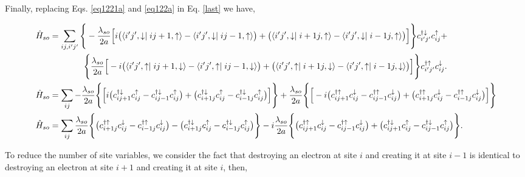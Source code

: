 \documentclass[10pt,prb,showpacs,amssymb,floatfix]{revtex4-1}
\begin{document}
Finally, replacing Eqs. \eqref{eq1221a} and \eqref{eq122a} in Eq. \eqref{last} we have,

\begin{align}
\label{last20}
\hat H_{so} &= \sum_{ij,i'j'} \Bigg{\{}  -\frac{\lambda_{so}}{2a} \Big{[} i \big{(} \langle i'j',\downarrow \mid  ij+1,\uparrow \rangle - \langle i'j',\downarrow \mid ij-1,\uparrow \rangle \big{)} + \big{(} \langle i'j',\downarrow \mid i+1j,\uparrow \rangle -  \langle i'j',\downarrow \mid i-1j,\uparrow \rangle\big{)} \Big{]}  \Bigg{\}} c_{i'j'}^{\dagger \downarrow} c_{ij}^\uparrow + \\ &  ~~~~~~~~~~~~\Bigg{\{}\frac{\lambda_{so}}{2a} \Big{[} -i \big{(} \langle i'j',\uparrow \mid ij+1,\downarrow \rangle -  \langle i'j',\uparrow \mid ij-1,\downarrow \rangle  \big{)}+ \big{(} \langle i'j',\uparrow \mid i+1j,\downarrow \rangle - \langle i'j',\uparrow \mid i-1j,\downarrow \rangle \big{)} \Big{]} \Bigg{\}} c_{i'j'}^{\dagger \uparrow} c_{ij}^\downarrow. \\
\hat H_{so} &= \sum_{ij} -\frac{\lambda_{so}}{2a}\Bigg{\{} \Big{[}i \big{(} c_{ij+1}^{\dagger \downarrow} c_{ij}^\uparrow  - c_{ij-1}^{\dagger \downarrow} c_{ij}^\uparrow \big{)} + \big{(} c_{i+1j}^{\dagger \downarrow} c_{ij}^\uparrow - c_{i-1j}^{\dagger \downarrow} c_{ij}^\uparrow \big{)}  \Big{]} \Bigg{\}} + \frac{\lambda_{so}}{2a} \Bigg{\{} \Big{[} -i \big{(} c_{ij+1}^{\dagger \uparrow} c_{ij}^\downarrow - c_{ij-1}^{\dagger \uparrow} c_{ij}^\downarrow\big{)} + \big{(} c_{i+1j}^{\dagger \uparrow} c_{ij}^\downarrow - c_{i-1j}^{\dagger \uparrow} c_{ij}^\downarrow \big{)} \Big{]} \Bigg{\}} \\
\hat H_{so} &= \sum_{ij} \frac{\lambda_{so}}{2a}  \Bigg{\{} \big{(} c_{i+1j}^{\dagger \uparrow} c_{ij}^\downarrow - c_{i-1j}^{\dagger \uparrow} c_{ij}^\downarrow \big{)} - \big{(} c_{i+1j}^{\dagger \downarrow} c_{ij}^\uparrow - c_{i-1j}^{\dagger \downarrow} c_{ij}^\uparrow \big{)}   \Bigg{\}}  -i\frac{\lambda_{so}}{2a} \Bigg{\{} \big{(} c_{ij+1}^{\dagger \uparrow} c_{ij}^\downarrow - c_{ij-1}^{\dagger \uparrow} c_{ij}^\downarrow\big{)} + \big{(} c_{ij+1}^{\dagger \downarrow} c_{ij}^\uparrow  - c_{ij-1}^{\dagger \downarrow} c_{ij}^\uparrow \big{)} \Bigg{\}}. 
\label{last2}
\end{align}

To reduce the number of site variables, we consider the fact that destroying an electron at site $i$ and creating it at site $i-1$ is identical to destroying an electron at site $i+1$ and creating it at site $i$, then,
\end{document}
